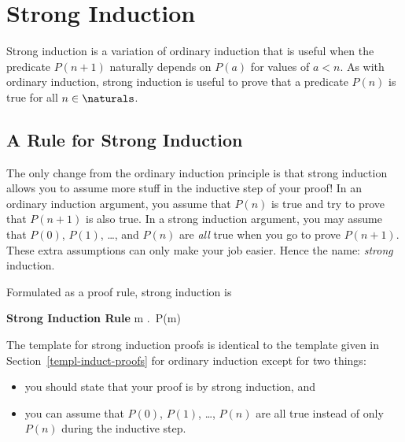 \section{Strong Induction}\label{sec:strong-induction}

Strong induction is a variation of ordinary induction that is useful
when the predicate $P(n+1)$ naturally depends on $P(a)$ for values of
$a < n$.  As with ordinary induction, strong induction is useful to
prove that a predicate $P(n)$ is true for all $n \in \naturals$.

\subsection{A Rule for Strong Induction}


The only change from the ordinary induction principle is that strong
induction allows you to assume more stuff in the inductive step of your
proof!  In an ordinary induction argument, you assume that $P(n)$ is true
and try to prove that $P(n+1)$ is also true.  In a strong induction
argument, you may assume that $P(0)$, $P(1)$, \dots, and $P(n)$ are
\emph{all} true when you go to prove $P(n+1)$.  These extra assumptions
can only make your job easier.  Hence the name: \emph{strong}
induction.

Formulated as a proof rule, strong induction is
\begin{rul*} \textbf{Strong Induction Rule}
\Rule{P(0), \quad \forall n \in \naturals. \;
    \bigl(P(0) \QAND P(1) \QAND \dots \QAND P(m) \bigr) \QIMPLIES P(n+1)]}
{\forall m \in \naturals.\, P(m)}
\end{rul*}

The template for strong induction proofs is identical to the template
given in Section~\ref{templ-induct-proofs} for ordinary induction
except for two things:
\begin{itemize}

\item
you should state that your proof is by strong induction, and

\item
you can assume that $P(0)$, $P(1)$, \dots, $P(n)$ are all true instead
of only $P(n)$ during the inductive step.

\end{itemize}

